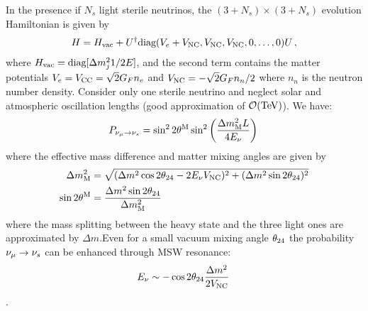 \documentclass[twocolumn]{article}
\begin{document}
In the presence if $N_s$ light sterile neutrinos, the $(3+N_s)\times(3+N_s)$ evolution Hamiltonian is given by
\begin{align*}
  H = H_{\text{{vac}}} + U^\dagger \text{{diag}}(V_e + V_{\text{{NC}}}, V_{\text{{NC}}}, V_{\text{{NC}}}, 0, \ldots, 0)U
\,,\end{align*}
where $H_\t{vac} = \t{diag}[\dm_j1/2E]$, and the second term contains the matter potentials $V_e = V_{\text{{CC}}} = \sqrt{2}G_F n_e$ and $V_{\text{{NC}}} = -\sqrt{2}G_F n_n/2$ where $n_n$ is the neutron number density. Consider only one sterile neutrino and neglect solar and atmospheric oscillation lengths (good approximation of $\mathcal{O}(\text{{TeV}})$). We have:
\begin{align*}
  P_{\nms} = \sin^2 2\thm \sin^2 \left( \frac{\dm[M] L}{4E_\nu} \right) 
\,\end{align*}
where the effective mass difference and matter mixing angles are given by
\begin{align*}
  \dm[M] &= \sqrt{(\dm \cos 2\th[24] - 2E_\nu V_\t{NC})^2 + (\dm \sin 2\th[24])^2}\\
  \sin 2\thm &= \frac{\dm \sin 2\th[24]}{\dm[M]}
\,\end{align*}
where the mass splitting between the heavy state and the three light ones are approximated by $\Delta m$.Even for a small vacuum mixing angle $\th[24]$ the probability $\nu_\mu \to \nu_s$ can be enhanced through MSW resonance:
\begin{align*}
  E_\nu \sim - \cos 2\th[24] \frac{\dm}{2 V_\t{NC}}
\,\end{align*}.
\end{document}
